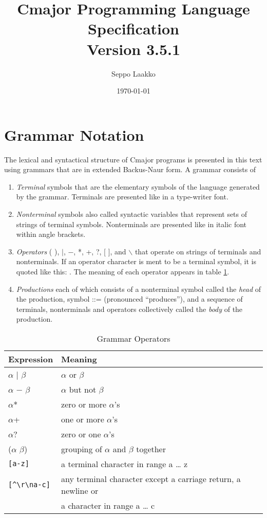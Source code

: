 \documentclass[a4paper,oneside,11pt]{article}
\begin{document}
\title{Cmajor Programming Language Specification\\Version 3.5.1}
\author{Seppo Laakko}
\date{\today}
\maketitle
\tableofcontents

\clearpage

\section{Grammar Notation}

The lexical and syntactical structure of Cmajor programs is presented in this text
using grammars that are in extended Backus-Naur form.
A grammar consists of

\begin{enumerate}
\item
\emph{Terminal} symbols that are the elementary symbols of the language generated by the grammar.
Terminals are presented like  in a type-writer font.
\item
\emph{Nonterminal} symbols also called syntactic variables that represent sets of strings of terminal symbols.
Nonterminals are presented like  in italic font within angle brackets.
\item
\emph{Operators} ( ), $|$, $-$, *, +, ?, [ ], and $\backslash$ that operate on strings of terminals and nonterminals.
If an operator character is ment to be a terminal symbol, it is quoted like this: \lit{*}.
The meaning of each operator appears in table \ref{tab:operators}.
\item
\emph{Productions} each of which consists of a nonterminal symbol called the \emph{head} of the production, symbol ::= (pronounced ``produces''), and
a sequence of terminals, nonterminals and operators collectively called the \emph{body} of the production.
\end{enumerate}

\begin{table}[htb]
\caption{Grammar Operators}\label{tab:operators}
\begin{tabular}{ll}
\bf{Expression}& \bf{Meaning}\\
\hline
$\alpha$ $|$ $\beta$ & $\alpha$ or $\beta$\\
$\alpha$ $-$ $\beta$ & $\alpha$ but not $\beta$\\
$\alpha$* & zero or more $\alpha$'s\\
$\alpha$+ & one or more $\alpha$'s\\
$\alpha$? & zero or one $\alpha$'s\\
($\alpha$ $\beta$) & grouping of $\alpha$ and $\beta$ together\\
\verb|[a-z]| & a terminal character in range a \ldots{} z\\
\verb|[^\r\na-c]| & any terminal character except a carriage return, a newline or\\& a character in range a \ldots{} c\\
\end{tabular}
\end{table}
\end{document}
